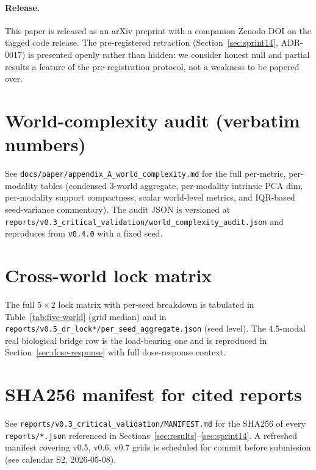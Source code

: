 \documentclass{article}
\begin{document}
\paragraph{Release.}
This paper is released as an arXiv preprint with a companion
Zenodo DOI on the tagged code release. The pre-registered
retraction (Section~\ref{sec:sprint14}, ADR-0017) is presented
openly rather than hidden: we consider honest null and partial
results a feature of the pre-registration protocol, not a
weakness to be papered over.


\appendix

\section{World-complexity audit (verbatim numbers)}
\label{app:world}

See \texttt{docs/paper/appendix\_A\_world\_complexity.md} for the
full per-metric, per-modality tables (condensed 3-world
aggregate, per-modality intrinsic PCA dim, per-modality support
compactness, scalar world-level metrics, and IQR-based
seed-variance commentary). The audit JSON is versioned at
\texttt{reports/v0.3\_critical\_validation/world\_complexity\_audit.json}
and reproduces from \texttt{v0.4.0} with a fixed seed.

\section{Cross-world lock matrix}
\label{app:lock-matrix}

The full $5 \times 2$ lock matrix with per-seed breakdown is
tabulated in Table~\ref{tab:five-world} (grid median) and in
\texttt{reports/v0.5\_dr\_lock*/per\_seed\_aggregate.json} (seed
level). The 4.5-modal real biological bridge row is the
load-bearing one and is reproduced in
Section~\ref{sec:dose-response} with full dose-response context.

\section{SHA256 manifest for cited reports}
\label{app:sha}

See \texttt{reports/v0.3\_critical\_validation/MANIFEST.md} for
the SHA256 of every \texttt{reports/*.json} referenced in
Sections~\ref{sec:results}--\ref{sec:sprint14}. A refreshed
manifest covering v0.5, v0.6, v0.7 grids is scheduled for
commit before submission (see calendar S2, 2026-05-08).




\end{document}

